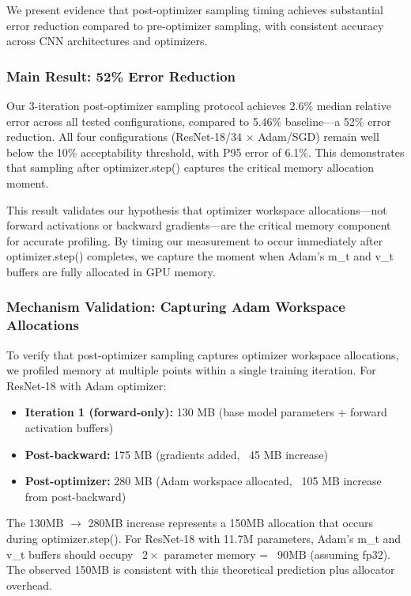
We present evidence that post-optimizer sampling timing achieves substantial error reduction compared to pre-optimizer sampling, with consistent accuracy across CNN architectures and optimizers.

\subsubsection{Main Result: 52\% Error Reduction}

Our 3-iteration post-optimizer sampling protocol achieves 2.6\% median relative error across all tested configurations, compared to 5.46\% baseline---a 52\% error reduction. All four configurations (ResNet-18/34 $\times$ Adam/SGD) remain well below the 10\% acceptability threshold, with P95 error of 6.1\%. This demonstrates that sampling after optimizer.step() captures the critical memory allocation moment.

This result validates our hypothesis that optimizer workspace allocations---not forward activations or backward gradients---are the critical memory component for accurate profiling. By timing our measurement to occur immediately after optimizer.step() completes, we capture the moment when Adam's m\_t and v\_t buffers are fully allocated in GPU memory.

\subsubsection{Mechanism Validation: Capturing Adam Workspace Allocations}

To verify that post-optimizer sampling captures optimizer workspace allocations, we profiled memory at multiple points within a single training iteration. For ResNet-18 with Adam optimizer:

\begin{itemize}
\item \textbf{Iteration 1 (forward-only):} 130 MB (base model parameters + forward activation buffers)
\item \textbf{Post-backward:} 175 MB (gradients added, ~45 MB increase)
\item \textbf{Post-optimizer:} 280 MB (Adam workspace allocated, ~105 MB increase from post-backward)
\end{itemize}

The 130MB $\rightarrow$ 280MB increase represents a 150MB allocation that occurs during optimizer.step(). For ResNet-18 with 11.7M parameters, Adam's m\_t and v\_t buffers should occupy ~$2\times$ parameter memory = ~90MB (assuming fp32). The observed 150MB is consistent with this theoretical prediction plus allocator overhead.

